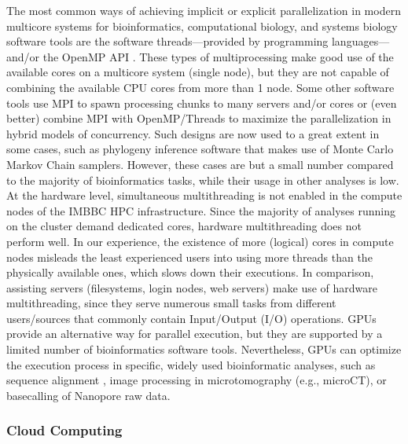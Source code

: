    The most common ways of achieving implicit or explicit parallelization in modern multicore systems for bioinformatics, computational biology, and systems biology software tools are the software threads—provided by programming languages—and/or the OpenMP API \citep{dagum1998openmp}. 
   These types of multiprocessing make good use of the available cores on a multicore system (single node), but they are not capable of combining the available CPU cores from more than 1 node. 
   Some other software tools use MPI to spawn processing chunks to many servers and/or cores or (even better) combine MPI with OpenMP/Threads to maximize the parallelization in hybrid models of concurrency. 
   Such designs are now used to a great extent in some cases, such as phylogeny inference software that makes use of Monte Carlo Markov Chain samplers.
   However, these cases are but a small number compared to the majority of bioinformatics tasks, while their usage in other analyses is low. At the hardware level, simultaneous multithreading is not enabled in the compute nodes of the IMBBC HPC infrastructure. 
   Since the majority of analyses running on the cluster demand dedicated cores, hardware multithreading does not perform well. 
   In our experience, the existence of more (logical) cores in compute nodes misleads the least experienced users into using more threads than the physically available ones, which slows down their executions. 
   In comparison, assisting servers (filesystems, login nodes, web servers) make use of hardware multithreading, since they serve numerous small tasks from different users/sources that commonly contain Input/Output (I/O) operations. 
   GPUs provide an alternative way for parallel execution, but they are supported by a limited number of bioinformatics software tools. Nevertheless, GPUs can optimize the execution process in specific, widely used bioinformatic analyses, such as sequence alignment \citep{vouzis2011gpu, nobile2017graphics}, image processing in microtomography (e.g., microCT), or basecalling of Nanopore raw data.



   \subsubsection*{Cloud Computing}

